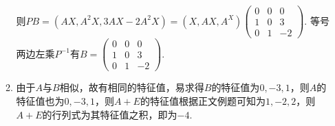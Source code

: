 \begin{enumerate}
\begin{enumerate}
                    则$PB=(AX,A^2X,3AX-2A^2X)=(X,AX,A^X)\begin{pmatrix}
                            0 & 0 & 0 \\ 1 & 0 & 3 \\ 0 & 1 & -2
                        \end{pmatrix}$. 等号两边左乘$P^{-1}$有$B=\begin{pmatrix}
                            0 & 0 & 0 \\ 1 & 0 & 3 \\ 0 & 1 & -2
                        \end{pmatrix}$.

              \item 由于$A$与$B$相似，故有相同的特征值，易求得$B$的特征值为$0,-3,1$，则$A$的特征值也为$0,-3,1$，则$A+E$的特征值根据正文例题可知为$1,-2,2$，则$A+E$的行列式为其特征值之积，即为$-4$.
          \end{enumerate}

\end{enumerate}

